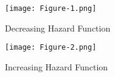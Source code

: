 \documentclass[journal,12pt,twocolumn]{IEEEtran}
\begin{document}
\vspace{0.5cm}\centering {}
\iffalse
\begin{figure}[h!]
    \texttt{[image: Figure-1.png]}
    \texttt{[image: Figure-2.png]}
\end{figure}
\fi
\begin{figure}[h]
    \centering
    \texttt{[image: Figure-1.png]}
    \caption{Decreasing Hazard Function}
    \label{fig:my_label1}
\end{figure}
\begin{figure}[h]
    \centering
    \texttt{[image: Figure-2.png]}
    \caption{Increasing Hazard Function}
    \label{fig:my_label2}
\end{figure}
\end{document}
